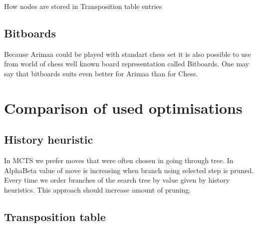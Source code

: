 	How nodes are stored in Transposition table entries

	\subsection{Bitboards}
	Because Arimaa could be played with standart chess set it is also possible
	to use from world of chess well known board representation called
	Bitboards. One may say that bitboards suits even better for Arimaa than for
	Chess.

\section{Comparison of used optimisations}

\subsection{History heuristic}
In MCTS we prefer moves that were often chosen in going through tree. In
AlphaBeta value of move is increasing when branch using selected step is
pruned. Every time we order branches of the search tree by value given by
history heuristics. This approach should increase amount of pruning.

\subsection{Transposition table}

